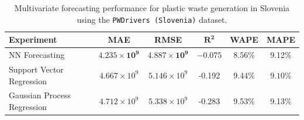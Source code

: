 \begin{table}[!ht]
	\centering
	\caption{\centering Multivariate forecasting performance for plastic waste generation in Slovenia using the \texttt{PWDrivers (Slovenia)} dataset.}
	\begin{tabular}{@{}lccccc@{}}
		\toprule
		\textbf{Experiment}         & \textbf{MAE}                   & \textbf{RMSE}                  & $\mathbf{R^2}$      & \textbf{WAPE}       & \textbf{MAPE}       \\
		\midrule
		NN Forecasting              & \(\mathbf{4.235 \times 10^9}\) & \(\mathbf{4.887 \times 10^9}\) & \(\mathbf{-0.075}\) & \(\mathbf{8.56}\)\% & 9.12\%              \\
		Support Vector Regression   & \(4.667 \times 10^9\)          & \(5.146 \times 10^9\)          & -0.192              & 9.44\%              & \(\mathbf{9.10}\)\% \\
		Gaussian Process Regression & \(4.712 \times 10^9\)          & \(5.338 \times 10^9\)          & -0.283              & 9.53\%              & 9.13\%              \\
		\hline
	\end{tabular}
	\label{tab:multivariate_forecasting_slovenia_metrics}
\end{table}
